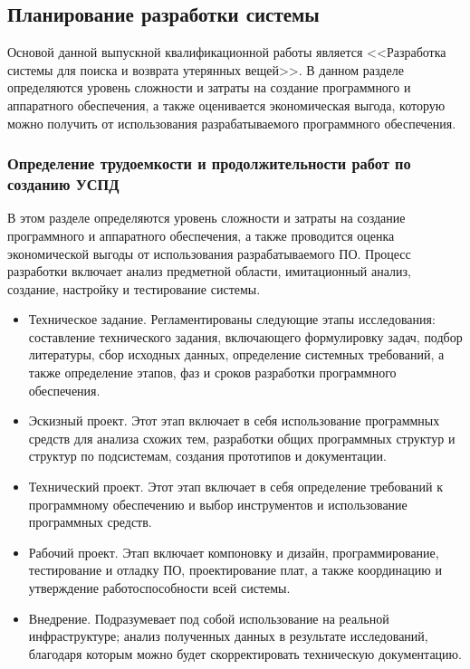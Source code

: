 \documentclass{mirea}
\begin{document}
\subsection{Планирование разработки системы}

Основой данной выпускной квалификационной работы является <<Разработка системы для поиска и возврата утерянных вещей>>. В данном разделе определяются уровень сложности и затраты на создание программного и аппаратного обеспечения, а также оценивается экономическая выгода, которую можно получить от использования разрабатываемого программного обеспечения.

\subsubsection{Определение трудоемкости и продолжительности работ по созданию УСПД}

В этом разделе определяются уровень сложности и затраты на создание программного и аппаратного обеспечения, а также проводится оценка экономической выгоды от использования разрабатываемого ПО. Процесс разработки включает анализ предметной области, имитационный анализ, создание, настройку и тестирование системы.

\begin{itemize}	
	\item Техническое задание. Регламентированы следующие этапы исследования: составление технического задания, включающего формулировку задач, подбор литературы, сбор исходных данных, определение системных требований, а также определение этапов, фаз и сроков разработки программного обеспечения.
	
	\item Эскизный проект. Этот этап включает в себя использование программных средств для анализа схожих тем, разработки общих программных структур и структур по подсистемам, создания прототипов и документации.
	
	\item Технический проект. Этот этап включает в себя определение требований к программному обеспечению и выбор инструментов и использование программных средств.
	
	\item Рабочий проект. Этап включает компоновку и дизайн, программирование, тестирование и отладку ПО, проектирование плат, а также координацию и утверждение работоспособности всей системы.
	
	\item Внедрение. Подразумевает под собой использование на реальной инфраструктуре; анализ полученных данных в результате исследований, благодаря которым можно будет скорректировать техническую документацию.
\end{itemize}
\end{document}
